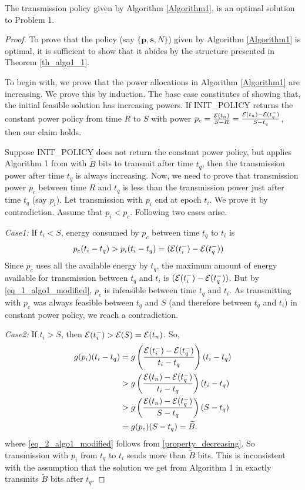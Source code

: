 \begin{theorem}
The transmission policy given by Algorithm \ref{Algorithm1}, is an optimal solution to Problem 1.
\label{th_algo1_2}
\end{theorem}


\begin{proof}
To prove that the policy (say $\{\textbf{p},\textbf{s},N\}$) given by Algorithm \ref{Algorithm1} is optimal, it is sufficient to show that it abides by the structure presented in Theorem \ref{th_algo1_1}.

To begin with, we prove that the power allocations in Algorithm \ref{Algorithm1} are increasing. We prove this by induction. The base case constitutes of showing that, the initial feasible solution has increasing powers. If INIT\_POLICY returns the constant power policy from time $R$ to $S$ with power $p_c=\frac{\mathcal{E}(t_n)}{S-R}=\frac{\mathcal{E}(t_n)-\mathcal{E}(t_q^-)}{S-t_q}$, then our claim holds. 

Suppose INIT\_POLICY does not return the constant power policy, but applies Algorithm 1 from \cite{Yang} with $\widetilde{B}$ bits to transmit after time $t_q$, then the transmission power after time $t_q$ is always increasing. Now, we need to prove that transmission power $p_c$ between time $R$ and $t_q$ is less than the transmission power just after time $t_q$ (say $p_i$). Let transmission with $p_i$ end at epoch $t_i$. We prove it by contradiction. Assume that $p_i<p_c$. Following two cases arise.

\textit{Case1:} If $t_i<S$, energy consumed by $p_c$ between time $t_q$ to $t_i$ is 
\begin{align}
&p_c(t_i-t_q)>p_i(t_i-t_q)=(\ETx(t_i^-)-\ETx(t_q^-))\label{eq_1_algo1_modified}
\end{align}
Since $p_c$ uses all the available energy by $t_q$, the maximum amount of energy available for transmission between $t_q$ and $t_i$ is $(\mathcal{E}(t_i^-)-\mathcal{E}(t_q^-))$. But by \eqref{eq_1_algo1_modified}, $p_c$ is infeasible between time $t_q$ and $t_i$. As transmitting with $p_c$ was always feasible between $t_q$ and $S$ (and therefore between $t_q$ and $t_i$) in constant power policy, we reach a contradiction.        

\textit{Case2:} If $t_i>S$, then $\mathcal{E}(t_i^-)>\mathcal{E}(S)=\mathcal{E}(t_n)$. So, 
\begin{align}
g(p_i)(t_i-t_q)&=g\left(\frac{\ETx(t_i^-)-\ETx(t_q^-)}{t_i-t_q}\right)(t_i-t_q)
\\
&>g\left(\frac{\ETx(t_n)-\ETx(t_q^-)}{t_i-t_q}\right)(t_i-t_q)
\\
&>g\left(\frac{\ETx(t_n)-\ETx(t_q^-)}{S-t_q}\right)(S-t_q)\label{eq_2_algo1_modified}
\\
&=g(p_c)(S-t_q)=\widetilde{B}.
\end{align}
where \eqref{eq_2_algo1_modified} follows from \eqref{property_decreasing}. So transmission with $p_i$ from $t_q$ to $t_i$ sends more than $\widetilde{B}$ bits. This is inconsistent with the assumption that the solution we get from Algorithm 1 in \cite{Yang} exactly transmits $\widetilde{B}$ bits after $t_q$. 


\end{proof}
